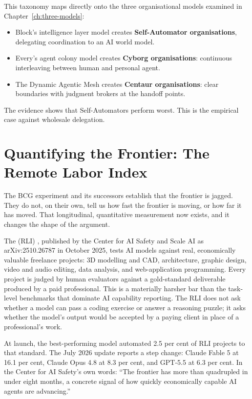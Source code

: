 \begin{keyinsight}[title={The Organisational Design Implication}]
This taxonomy maps directly onto the three organisational models examined in Chapter~\ref{ch:three-models}:
\begin{itemize}
  \item Block's intelligence layer model creates \textbf{Self-Automator organisations}, delegating coordination to an AI world model.
  \item Every's agent colony model creates \textbf{Cyborg organisations}: continuous interleaving between human and personal agent.
  \item The Dynamic Agentic Mesh creates \textbf{Centaur organisations}: clear boundaries with judgment brokers at the handoff points.
\end{itemize}
The evidence shows that Self-Automators perform worst. This is the empirical case against wholesale delegation.
\end{keyinsight}

\section{Quantifying the Frontier: The Remote Labor Index}

The BCG experiment and its successors establish that the frontier is jagged. They do not, on their own, tell us how fast the frontier is moving, or how far it has moved. That longitudinal, quantitative measurement now exists, and it changes the shape of the argument.

The  (RLI) \parencite{RLI2025}, published by the Center for AI Safety and Scale AI as arXiv:2510.26787 in October 2025, tests AI models against real, economically valuable freelance projects: 3D modelling and CAD, architecture, graphic design, video and audio editing, data analysis, and web-application programming. Every project is judged by human evaluators against a gold-standard deliverable produced by a paid professional. This is a materially harsher bar than the task-level benchmarks that dominate AI capability reporting. The RLI does not ask whether a model can pass a coding exercise or answer a reasoning puzzle; it asks whether the model's output would be accepted by a paying client in place of a professional's work.

At launch, the best-performing model automated 2.5 per cent of RLI projects to that standard. The July 2026 update \parencite{CAIS2026RLI} reports a step change: Claude Fable 5 at 16.1 per cent, Claude Opus 4.8 at 8.3 per cent, and GPT-5.5 at 6.3 per cent. In the Center for AI Safety's own words: ``The frontier has more than quadrupled in under eight months, a concrete signal of how quickly economically capable AI agents are advancing.''

